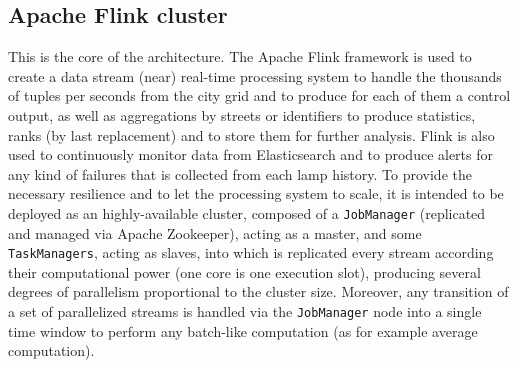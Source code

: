 \subsection{Apache Flink cluster}
This is the core of the architecture. The Apache Flink framework is used to create a data stream (near) real-time processing system to handle the thousands of tuples per seconds from the city grid and to produce for each of them a control output, as well as aggregations by streets or identifiers to produce statistics, ranks (by last replacement) and to store them for further analysis. Flink is also used to continuously monitor data from Elasticsearch and to produce alerts for any kind of failures that is collected from each lamp history. To provide the necessary resilience and to let the processing system to scale, it is intended to be deployed as an highly-available cluster, composed of a \texttt{JobManager} (replicated and managed via Apache Zookeeper), acting as a master, and some \texttt{TaskManagers}, acting as slaves, into which is replicated every stream according their computational power (one core is one execution slot), producing several degrees of parallelism proportional to the cluster size. Moreover, any transition of a set of parallelized streams is handled via the \texttt{JobManager} node into a single time window to perform any batch-like computation (as for example average computation).

